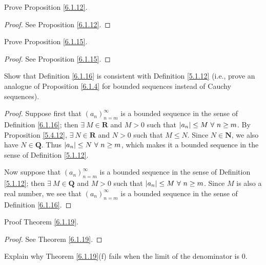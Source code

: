\begin{exercise}\label{ex 6.1.5}
    Prove Proposition \ref{6.1.12}.
\end{exercise}

\begin{proof}
    See Proposition \ref{6.1.12}.
\end{proof}

\begin{exercise}\label{ex 6.1.6}
    Prove Proposition \ref{6.1.15}.
\end{exercise}

\begin{proof}
    See Proposition \ref{6.1.15}.
\end{proof}

\begin{exercise}\label{ex 6.1.7}
    Show that Definition \ref{6.1.16} is consistent with Definition \ref{5.1.12}
    (i.e., prove an analogue of Proposition \ref{6.1.4} for bounded sequences instead of Cauchy sequences).
\end{exercise}

\begin{proof}
    Suppose first that \((a_n)_{n = m}^\infty\) is a bounded sequence in the sense of Definition \ref{6.1.16};
    then \(\exists\ M \in \mathbf{R}\) and \(M > 0\) such that \(\abs*{a_n} \leq M \ \forall\ n \geq m\).
    By Proposition \ref{5.4.12}, \(\exists\ N \in \mathbf{R}\) and \(N > 0\) such that \(M \leq N\).
    Since \(N \in \mathbf{N}\), we also have \(N \in \mathbf{Q}\).
    Thus \(\abs*{a_n} \leq N \ \forall\ n \geq m\), which makes it a bounded sequence in the sense of Definition \ref{5.1.12}.

    Now suppose that \((a_n)_{n = m}^\infty\) is a bounded sequence in the sense of Definition \ref{5.1.12};
    then \(\exists\ M \in \mathbf{Q}\) and \(M > 0\) such that \(\abs*{a_n} \leq M \ \forall\ n \geq m\).
    Since \(M\) is also a real number, we see that \((a_n)_{n = m}^\infty\) is a bounded sequence in the sense of Definition \ref{6.1.16}.
\end{proof}

\begin{exercise}\label{ex 6.1.8}
    Proof Theorem \ref{6.1.19}.
\end{exercise}

\begin{proof}
    See Theorem \ref{6.1.19}.
\end{proof}

\begin{exercise}\label{ex 6.1.9}
    Explain why Theorem \ref{6.1.19}(f) fails when the limit of the denominator is \(0\).
\end{exercise}

